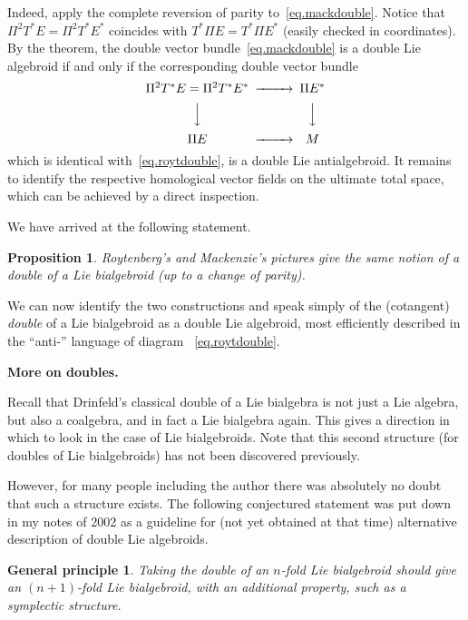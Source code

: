 \documentclass[12pt,reqno,a4paper]{amsart}
\newtheorem*{genprinc}{General principle}
\newtheorem{prop}{Proposition}[section]
\theoremstyle{definition}
\begin{document}
Indeed, apply the complete reversion of parity
to~\eqref{eq.mackdouble}. Notice that $\Pi^2 T^*E=\Pi^2 T^*E^*$
coincides with $T^* \Pi E=T^* \Pi E^*$ (easily checked in
coordinates). By the theorem, the double vector
bundle~\eqref{eq.mackdouble} is a double Lie algebroid if and only
if the corresponding double vector bundle
\begin{equation} \label{eq.mackdoublepikv}
    \begin{CD} \Pi^2T^*E=\Pi^2T^*E^*@>>>   \Pi E^*\\
                @VVV  @VVV \\
               \Pi E@>>>M
    \end{CD}
\end{equation}
which is identical with~\eqref{eq.roytdouble}, is a double Lie
antialgebroid. It remains to identify the respective homological
vector fields on the ultimate total space, which can be achieved by
a direct inspection.

We have arrived at the following statement.
\begin{prop} Roytenberg's and Mackenzie's pictures give the same notion of a double of a Lie
bialgebroid (up to a change of parity).
\end{prop}

We can now identify the two constructions and speak simply of the
(cotangent) \textit{double} of a Lie bialgebroid  as a double Lie
algebroid, most efficiently described in the ``anti-'' language of
diagram ~\eqref{eq.roytdouble}.

\textbf{More on doubles.}

\smallskip
Recall that Drinfeld's classical double of a Lie bialgebra is not
just a Lie algebra, but also a coalgebra, and in fact a Lie
bialgebra again. This gives a direction in which to look in the case
of Lie bialgebroids. Note that this second structure (for doubles of
Lie bialgebroids) has not been discovered previously.

However, for many people including the author there was absolutely
no doubt that such a structure exists. The following conjectured
statement was put down in my notes of 2002 as a guideline for (not
yet obtained at that time) alternative description of double Lie
algebroids.

\begin{genprinc}
Taking the double of an $n$-fold Lie bialgebroid should give  an
$(n+1)$-fold Lie bialgebroid, with an additional property, such as a
symplectic structure.
\end{genprinc}
\end{document}
